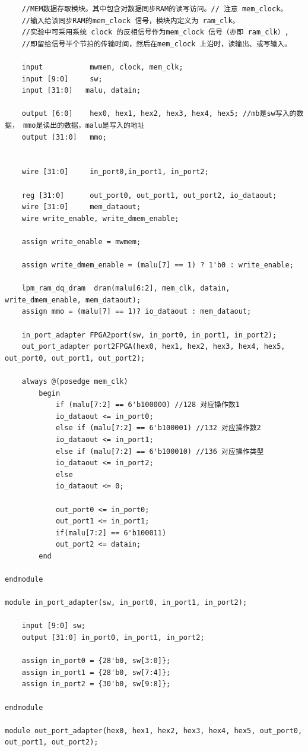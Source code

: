 \documentclass[UTF8]{ctexart}
\begin{document}
\begin{verbatim}
    //MEM数据存取模块。其中包含对数据同步RAM的读写访问。// 注意 mem_clock。
    //输入给该同步RAM的mem_clock 信号，模块内定义为 ram_clk。
    //实验中可采用系统 clock 的反相信号作为mem_clock 信号（亦即 ram_clk）,
    //即留给信号半个节拍的传输时间，然后在mem_clock 上沿时，读输出、或写输入。

    input  			mwmem, clock, mem_clk;
    input [9:0]		sw;
    input [31:0]   malu, datain;

    output [6:0] 	hex0, hex1, hex2, hex3, hex4, hex5; //mb是sw写入的数据， mmo是读出的数据，malu是写入的地址
    output [31:0] 	mmo;


    wire [31:0]  	in_port0,in_port1, in_port2;

    reg [31:0] 		out_port0, out_port1, out_port2, io_dataout;
    wire [31:0] 	mem_dataout;
    wire write_enable, write_dmem_enable;

    assign write_enable = mwmem;

    assign write_dmem_enable = (malu[7] == 1) ? 1'b0 : write_enable;

    lpm_ram_dq_dram  dram(malu[6:2], mem_clk, datain, write_dmem_enable, mem_dataout);
    assign mmo = (malu[7] == 1)? io_dataout : mem_dataout;

    in_port_adapter FPGA2port(sw, in_port0, in_port1, in_port2);
    out_port_adapter port2FPGA(hex0, hex1, hex2, hex3, hex4, hex5, out_port0, out_port1, out_port2);

    always @(posedge mem_clk)
        begin
            if (malu[7:2] == 6'b100000) //128 对应操作数1
            io_dataout <= in_port0;
            else if (malu[7:2] == 6'b100001) //132 对应操作数2
            io_dataout <= in_port1;
            else if (malu[7:2] == 6'b100010) //136 对应操作类型
            io_dataout <= in_port2;
            else
            io_dataout <= 0;

            out_port0 <= in_port0;
            out_port1 <= in_port1;
            if(malu[7:2] == 6'b100011)
            out_port2 <= datain;
        end

endmodule

module in_port_adapter(sw, in_port0, in_port1, in_port2);

    input [9:0] sw;
    output [31:0] in_port0, in_port1, in_port2;

    assign in_port0 = {28'b0, sw[3:0]};
    assign in_port1 = {28'b0, sw[7:4]};
    assign in_port2 = {30'b0, sw[9:8]};

endmodule

module out_port_adapter(hex0, hex1, hex2, hex3, hex4, hex5, out_port0, out_port1, out_port2);


\end{verbatim}
\end{document}
